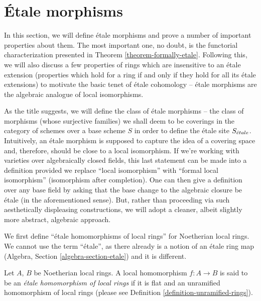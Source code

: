 \section{\'Etale morphisms}
\label{section-etale-morphisms}

\noindent
In this section, we will define \'etale morphisms and prove a number of
important properties about them. The most important one, no doubt, is the
functorial characterization presented in Theorem \ref{theorem-formally-etale}.
Following this, we will also discuss a few properties of rings which are
insensitive to an \'etale extension (properties which hold for a ring
if and only if they hold for all its \'etale extensions) to motivate the basic
tenet of \'etale cohomology -- \'etale morphisms are the algebraic analogue of
local isomorphisms.

\medskip\noindent
As the title suggests, we will define the class of \'etale morphisms -- the
class of morphisms (whose surjective families) we shall deem to be coverings
in the category of schemes over a base scheme $S$ in order to define the
\'etale site $S_{\acute{e}tale}$. Intuitively, an \'etale morphism is supposed
to capture the idea of a covering space and, therefore, should be close to a
local isomorphism. If we're working with varieties over algebraically closed
fields, this last statement can be made into a definition provided we replace
``local isomorphism'' with ``formal local isomorphism'' (isomorphism after
completion). One can then give a definition over any base field by asking
that the base change to the algebraic closure be \'etale (in the
aforementioned sense). But, rather than proceeding via such aesthetically
displeasing constructions, we will adopt a cleaner, albeit slightly more
abstract, algebraic approach.

\medskip\noindent
We first define ``\'etale homomorphisms of local rings'' for Noetherian
local rings. We cannot use the term ``\'etale'', as there already
is a notion of an \'etale ring map
(Algebra, Section \ref{algebra-section-etale})
and it is different.

\begin{definition}
\label{definition-etale-ring}
Let $A$, $B$ be Noetherian local rings.
A local homomorphism $f : A \to B$ is said to be an
{\it \'etale homomorphism of local rings}
if it is flat and an unramified homomorphism of local rings
(please see Definition \ref{definition-unramified-rings}).
\end{definition}

